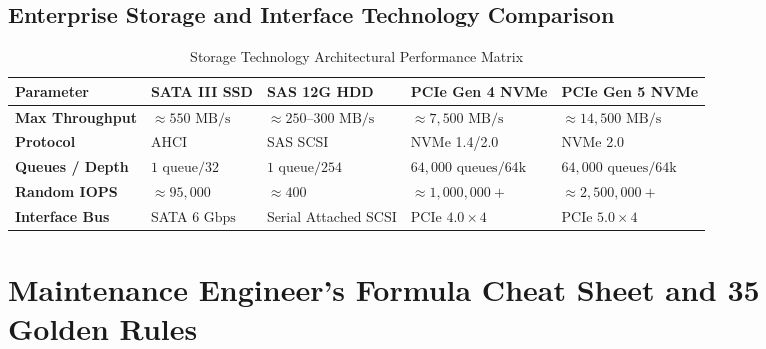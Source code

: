 \subsection{Enterprise Storage and Interface Technology Comparison}
\begin{table}[H]
\centering
\small
{}
\begin{tabularx}{\linewidth}{l l l l X}
\toprule
\rowcolor{tableheadercolor}
\textbf{Parameter} & \textbf{SATA III SSD} & \textbf{SAS 12G HDD} & \textbf{PCIe Gen 4 NVMe} & \textbf{PCIe Gen 5 NVMe} \\
\midrule
\textbf{Max Throughput} & $\approx 550\text{ MB/s}$ & $\approx 250\text{--}300\text{ MB/s}$ & $\approx 7,500\text{ MB/s}$ & $\approx 14,500\text{ MB/s}$ \\
\textbf{Protocol} & AHCI & SAS SCSI & NVMe 1.4/2.0 & NVMe 2.0 \\
\textbf{Queues / Depth} & $1\text{ queue} / 32$ & $1\text{ queue} / 254$ & $64,000\text{ queues} / 64\text{k}$ & $64,000\text{ queues} / 64\text{k}$ \\
\textbf{Random IOPS} & $\approx 95,000$ & $\approx 400$ & $\approx 1,000,000+$ & $\approx 2,500,000+$ \\
\textbf{Interface Bus} & SATA $6\text{ Gbps}$ & Serial Attached SCSI & PCIe $4.0 \times4$ & PCIe $5.0 \times4$ \\
\bottomrule
\end{tabularx}
\caption{Storage Technology Architectural Performance Matrix}
\end{table}

\section{Maintenance Engineer's Formula Cheat Sheet and 35 Golden Rules}

